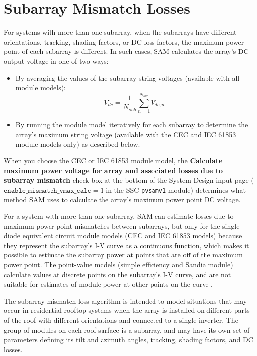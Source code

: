 \documentclass[12pt,letterpaper]{article}
\begin{document}
\section{Subarray Mismatch Losses}\label{sec-subarraymismatch}
For systems with more than one subarray, when the subarrays have different orientations, tracking, shading factors, or DC loss factors, the maximum power point of each subarray is different. In such cases, SAM calculates the array's DC output voltage in one of two ways:
\begin{itemize}
\item By averaging the values of the subarray string voltages (available with all module models): 
\begin{equation}
V_{dc} =  \frac{1}{N_{sub}}\sum_{n=1}^{N_{sub}} V_{dc,n}
\end{equation}
\item By running the module model iteratively for each subarray to determine the array's maximum string voltage (available with the CEC and IEC 61853 module models only) as described below.
\end{itemize}

When you choose the CEC or IEC 61853 module model, the \textbf{Calculate maximum power voltage for array and associated losses due to subarray mismatch} check box at the bottom of the System Design input page ($\mathtt{enable\_mismatch\_vmax\_calc}=1$ in the SSC \texttt{pvsamv1} module) determines what method SAM uses to calculate the array's maximum power point DC voltage.

For a system with more than one subarray, SAM can estimate losses due to maximum power point mismatches between subarrays, but only for the single-diode equivalent circuit module models (CEC and IEC 61853 models) because they represent the subarray's I-V curve as a continuous function, which makes it possible to estimate the subarray power at points that are off of the maximum power point. The point-value models (simple efficiency and Sandia module) calculate values at discrete points on the subarray's I-V curve, and are not suitable for estimates of module power at other points on the curve \citep{dobos2012b}.

The subarray mismatch loss algorithm \citep{dobos2012b} is intended to model situations that may occur in residential rooftop systems when the array is installed on different parts of the roof with different orientations and connected to a single inverter. The group of modules on each roof surface is a subarray, and may have its own set of parameters defining its tilt and azimuth angles, tracking, shading factors, and DC losses. 
\end{document}
